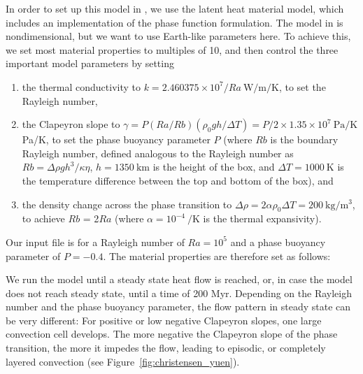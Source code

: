 In order to set up this model in \aspect{}, we use the latent heat material model, which includes an implementation of the phase function formulation. 
The model in \cite{CY85} is nondimensional, but we want to use Earth-like parameters here. To achieve this, we set most material properties to multiples of 10, and then control the three important model parameters by setting
\begin{enumerate}
  \item the thermal conductivity to $k = 2.460375 \times 10^7 / Ra~\si{\watt\per\metre\per\kelvin}$, to set the Rayleigh number,
  \item the Clapeyron slope to $\gamma = P (Ra/Rb) (\rho_0 g h/\Delta T) = P/2 \times 1.35 \times 10^7~\si{\pascal\per\kelvin}$ Pa/K, to set the phase buoyancy parameter $P$ (where $Rb$ is the boundary Rayleigh number, defined analogous to the Rayleigh number as $Rb = \Delta \rho g h^3 / \kappa \eta$, $h=1350~\si{\km}$ is the height of the box, and $\Delta T = 1000~\si{\kelvin}$ is the temperature difference between the top and bottom of the box), and 
  \item the density change across the phase transition to $\Delta \rho = 2 \alpha \rho_0 \Delta T = 200~\si{\kg\per\cubic\meter}$, to achieve $Rb$ = 2$Ra$ (where $\alpha = 10^{-4}~\si{\per\kelvin}$ is the thermal expansivity). 
\end{enumerate}   

Our input file is for a Rayleigh number of $Ra = 10^5$ and a phase buoyancy parameter of $P=-0.4$.                                  
The material properties are therefore set as follows:



We run the model until a steady state heat flow is reached, or, in case the model does not reach steady state, until a time of 200 Myr. 
Depending on the Rayleigh number and the phase buoyancy parameter, the flow pattern in steady state can be very different: For positive or low negative Clapeyron slopes, one large convection cell develops. The more negative the Clapeyron slope of the phase transition, the more it impedes the flow, leading to episodic, or completely layered convection (see Figure~\ref{fig:christensen_yuen}). 

